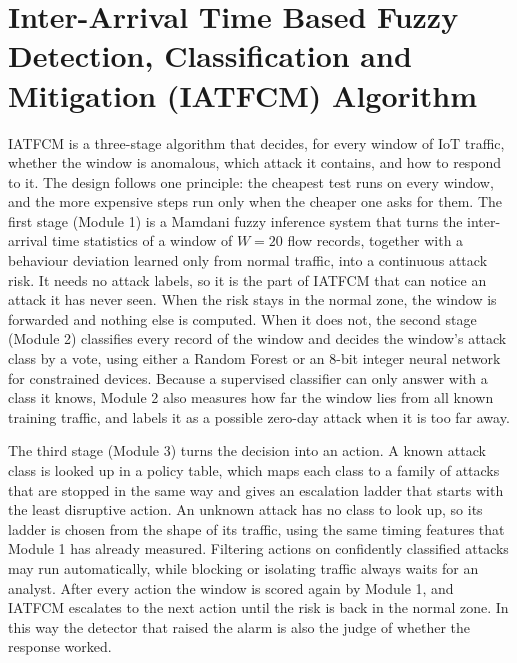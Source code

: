 \documentclass[]{interact}
\theoremstyle{plain}
\theoremstyle{definition}
\begin{document}
\section{Inter-Arrival Time Based Fuzzy Detection, Classification and Mitigation (IATFCM) Algorithm}\label{sec:iatfcm}
IATFCM is a three-stage algorithm that decides, for every window of IoT traffic, whether the window is anomalous, which attack it contains, and how to respond to it. The design follows one principle: the cheapest test runs on every window, and the more expensive steps run only when the cheaper one asks for them. The first stage (Module 1) is a Mamdani fuzzy inference system\cite{mamdani1975experiment} that turns the inter-arrival time statistics of a window of $W = 20$ flow records, together with a behaviour deviation learned only from normal traffic, into a continuous attack risk. It needs no attack labels, so it is the part of IATFCM that can notice an attack it has never seen. When the risk stays in the normal zone, the window is forwarded and nothing else is computed. When it does not, the second stage (Module 2) classifies every record of the window and decides the window's attack class by a vote, using either a Random Forest\cite{breiman2001random} or an 8-bit integer neural network for constrained devices\cite{jacob2018quantization}. Because a supervised classifier can only answer with a class it knows, Module 2 also measures how far the window lies from all known training traffic, and labels it as a possible zero-day attack when it is too far away.

The third stage (Module 3) turns the decision into an action. A known attack class is looked up in a policy table, which maps each class to a family of attacks that are stopped in the same way and gives an escalation ladder that starts with the least disruptive action. An unknown attack has no class to look up, so its ladder is chosen from the shape of its traffic, using the same timing features that Module 1 has already measured. Filtering actions on confidently classified attacks may run automatically, while blocking or isolating traffic always waits for an analyst. After every action the window is scored again by Module 1, and IATFCM escalates to the next action until the risk is back in the normal zone. In this way the detector that raised the alarm is also the judge of whether the response worked.
\end{document}
